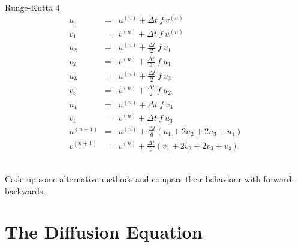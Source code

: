 \begin{enumerate}
\begin{minipage}[t]{0.45\columnwidth}
\begin{center}
\begin{eqnarray*}
\end{eqnarray*}
\par\end{center}%
\end{minipage}\hfill{}%
\begin{minipage}[t]{0.45\columnwidth}%
\begin{center}
Runge-Kutta 4
\begin{eqnarray*}
u_{1} & = & u^{(n)}+\Delta t\ f\ v^{(n)}\\
v_{1} & = & v^{(n)}+\Delta t\ f\ u^{(n)}\\
u_{2} & = & u^{(n)}+\frac{\Delta t}{2}\ f\ v_{1}\\
v_{2} & = & v^{(n)}+\frac{\Delta t}{2}\ f\ u_{1}\\
u_{3} & = & u^{(n)}+\frac{\Delta t}{2}\ f\ v_{2}\\
v_{3} & = & v^{(n)}+\frac{\Delta t}{2}\ f\ u_{2}\\
u_{4} & = & u^{(n)}+\Delta t\ f\ v_{3}\\
v_{4} & = & v^{(n)}+\Delta t\ f\ u_{3}\\
u^{(n+1)} & = & u^{(n)}+\frac{\Delta t}{6}\left(u_{1}+2u_{2}+2u_{3}+u_{4}\right)\\
v^{(n+1)} & = & v^{(n)}+\frac{\Delta t}{6}\left(v_{1}+2v_{2}+2v_{3}+v_{4}\right)
\end{eqnarray*}
\par\end{center}%
\end{minipage} \\
Code up some alternative methods and compare their behaviour with
forward-backwards.
\end{enumerate}
\clearpage{}

\section{The Diffusion Equation}

